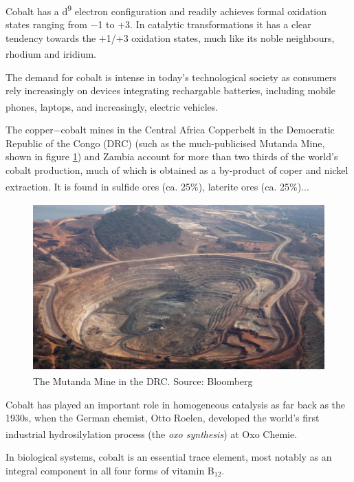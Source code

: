 Cobalt has a d\textsuperscript{9} electron configuration and readily achieves formal oxidation states ranging from $-$1 to $+$3. In catalytic transformations it has a clear tendency towards the $+$1/$+$3 oxidation states, much like its noble neighbours, rhodium and iridium.\textsuperscript{\cite{hapke:2020}}

The demand for cobalt is intense in today's technological society as consumers rely increasingly on devices integrating rechargable batteries, including mobile phones, laptops, and increasingly, electric vehicles.\textsuperscript{\cite{crundwell:2011}}

The copper$-$cobalt mines in the Central Africa Copperbelt in the Democratic Republic of the Congo (DRC) (such as the much-publicised Mutanda Mine, shown in figure \ref{fig:mutanda}) and Zambia account for more than two thirds of the world's cobalt production, much of which is obtained as a by-product of coper and nickel extraction. It is found in sulfide ores (ca. 25\%), laterite ores (ca. 25\%)...\textsuperscript{\cite{crundwell:2011, wef:2020}}

\begin{figure}
\centering
\begin{minipage}{\textwidth}
   \centering
   \includegraphics[height=6.5cm]{gfx/mutanda} %
   \caption{The Mutanda Mine in the DRC. Source: Bloomberg}
   \label{fig:mutanda}
\end{minipage}\hfill
\end{figure}

Cobalt has played an important role in homogeneous catalysis as far back as the 1930s, when the German chemist, Otto Roelen, developed the world's first industrial hydrosilylation process (the \textit{oxo synthesis}) at Oxo Chemie.\textsuperscript{\cite{hapke:2020}}

In biological systems, cobalt is an essential trace element, most notably as an integral component in all four forms of vitamin B$_{12}$.

